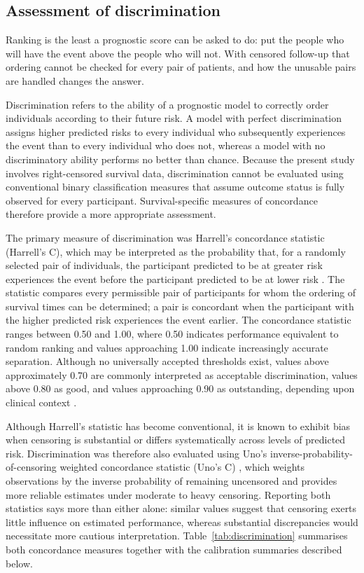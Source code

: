 \subsection{Assessment of discrimination}
\label{sec:prog-disc}

\noindent Ranking is the least a prognostic score can be asked to do: put the people who will have the event above the people who will not. With censored follow-up that ordering cannot be checked for every pair of patients, and how the unusable pairs are handled changes the answer.

Discrimination refers to the ability of a prognostic model to correctly order individuals according to their future risk. A model with perfect discrimination assigns higher predicted risks to every individual who subsequently experiences the event than to every individual who does not, whereas a model with no discriminatory ability performs no better than chance. Because the present study involves right-censored survival data, discrimination cannot be evaluated using conventional binary classification measures that assume outcome status is fully observed for every participant. Survival-specific measures of concordance therefore provide a more appropriate assessment.

The primary measure of discrimination was Harrell's concordance statistic (Harrell's C), which may be interpreted as the probability that, for a randomly selected pair of individuals, the participant predicted to be at greater risk experiences the event before the participant predicted to be at lower risk \citep{harrell_1996}. The statistic compares every permissible pair of participants for whom the ordering of survival times can be determined; a pair is concordant when the participant with the higher predicted risk experiences the event earlier. The concordance statistic ranges between 0.50 and 1.00, where 0.50 indicates performance equivalent to random ranking and values approaching 1.00 indicate increasingly accurate separation. Although no universally accepted thresholds exist, values above approximately 0.70 are commonly interpreted as acceptable discrimination, values above 0.80 as good, and values approaching 0.90 as outstanding, depending upon clinical context \citep{hosmer_2013}.

Although Harrell's statistic has become conventional, it is known to exhibit bias when censoring is substantial or differs systematically across levels of predicted risk. Discrimination was therefore also evaluated using Uno's inverse-probability-of-censoring weighted concordance statistic (Uno's C) \citep{uno_2011}, which weights observations by the inverse probability of remaining uncensored and provides more reliable estimates under moderate to heavy censoring. Reporting both statistics says more than either alone: similar values suggest that censoring exerts little influence on estimated performance, whereas substantial discrepancies would necessitate more cautious interpretation. Table~\ref{tab:discrimination} summarises both concordance measures together with the calibration summaries described below.

